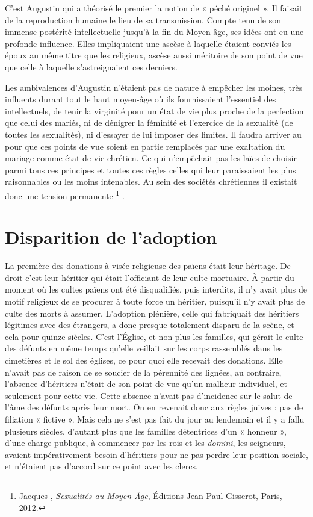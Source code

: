  C'est Augustin qui a théorisé le premier la notion de « péché originel ». Il faisait de la reproduction humaine le lieu de sa transmission. Compte tenu de son immense postérité intellectuelle jusqu'à la fin du Moyen-âge, ses idées ont eu une profonde influence. Elles impliquaient une ascèse à laquelle étaient conviés les époux au même titre que les religieux, ascèse aussi méritoire de son point de vue que celle à laquelle s'astreignaient ces derniers. 

 Les ambivalences d'Augustin n'étaient pas de nature à empêcher les moines, très influents durant tout le haut moyen-âge où ils fournissaient l'essentiel des intellectuels, de tenir la virginité pour un état de vie plus proche de la perfection que celui des mariés, ni de dénigrer la féminité et l'exercice de la sexualité (de toutes les sexualités), ni d'essayer de lui imposer des limites. Il faudra arriver au  pour que ces points de vue soient en partie remplacés par une exaltation du mariage comme état de vie chrétien. Ce qui n'empêchait pas les laïcs de choisir parmi tous ces principes et toutes ces règles celles qui leur paraissaient les plus raisonnables ou les moins intenables. Au sein des sociétés chrétiennes il existait donc une tension permanente%
\footnote{Jacques , \emph{Sexualités au Moyen-Âge}, Éditions Jean-Paul Gisserot, Paris, 2012.}%
. 
 

\section{Disparition de l'adoption}

 La première des donations à visée religieuse des païens était leur héritage. De droit c'est leur héritier qui était l'officiant de leur culte mortuaire. À partir du moment où les cultes païens ont été disqualifiés, puis interdits, il n'y avait plus de motif religieux de se procurer à toute force un héritier, puisqu'il n'y avait plus de culte des morts à assumer. L'adoption plénière, celle qui fabriquait des héritiers légitimes avec des étrangers, a donc presque totalement disparu de la scène, et cela pour quinze siècles. C'est l'Église, et non plus les familles, qui gérait le culte des défunts en même temps qu'elle veillait sur les corps rassemblés dans les cimetières et le sol des églises, ce pour quoi elle recevait des donations. Elle n'avait pas de raison de se soucier de la pérennité des lignées, au contraire, l'absence d'héritiers n'était de son point de vue qu'un malheur individuel, et seulement pour cette vie. Cette absence n'avait pas d'incidence sur le salut de l'âme des défunts après leur mort. On en revenait donc aux règles juives : pas de filiation « fictive ». Mais cela ne s'est pas fait du jour au lendemain et il y a fallu plusieurs siècles, d'autant plus que les familles détentrices d'un « honneur », d'une charge publique, à commencer par les rois et les \emph{domini}, les seigneurs, avaient impérativement besoin d'héritiers pour ne pas perdre leur position sociale, et n'étaient pas d'accord sur ce point avec les clercs. 


